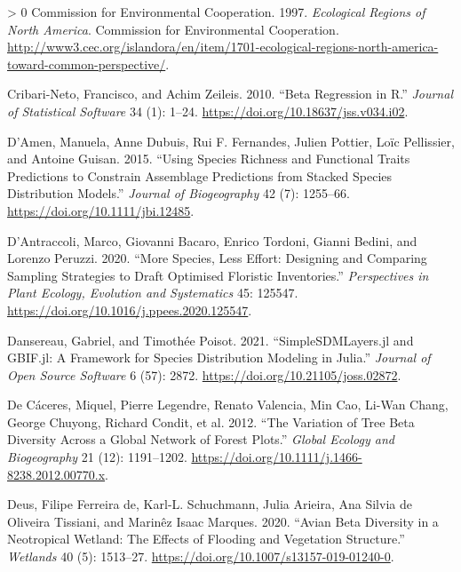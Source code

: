 \documentclass[10pt,oneside]{article}
\newlength{\cslhangindent}
\newenvironment{CSLReferences}[3] %
 {%
  \setlength{\parindent}{0pt}
  \ifodd #1 \everypar{\setlength{\hangindent}{\cslhangindent}}\ignorespaces\fi
  \ifnum #2 > 0
  \setlength{\parskip}{#2\baselineskip}
  \fi
 }%
 {}
\begin{document}
\begin{CSLReferences}{1}{0}
\leavevmode\hypertarget{ref-CommissionforEnvironmentalCooperation1997EcoReg}{}%
Commission for Environmental Cooperation. 1997. \emph{Ecological Regions
of North America}. Commission for Environmental Cooperation.
\url{http://www3.cec.org/islandora/en/item/1701-ecological-regions-north-america-toward-common-perspective/}.

\leavevmode\hypertarget{ref-Cribari-Neto2010BetReg}{}%
Cribari-Neto, Francisco, and Achim Zeileis. 2010. {``Beta Regression in
R.''} \emph{Journal of Statistical Software} 34 (1): 1--24.
\url{https://doi.org/10.18637/jss.v034.i02}.

\leavevmode\hypertarget{ref-DAmen2015UsiSpe}{}%
D'Amen, Manuela, Anne Dubuis, Rui F. Fernandes, Julien Pottier, Loïc
Pellissier, and Antoine Guisan. 2015. {``Using Species Richness and
Functional Traits Predictions to Constrain Assemblage Predictions from
Stacked Species Distribution Models.''} \emph{Journal of Biogeography}
42 (7): 1255--66. \url{https://doi.org/10.1111/jbi.12485}.

\leavevmode\hypertarget{ref-DAntraccoli2020MorSpe}{}%
D'Antraccoli, Marco, Giovanni Bacaro, Enrico Tordoni, Gianni Bedini, and
Lorenzo Peruzzi. 2020. {``More Species, Less Effort: Designing and
Comparing Sampling Strategies to Draft Optimised Floristic
Inventories.''} \emph{Perspectives in Plant Ecology, Evolution and
Systematics} 45: 125547.
\url{https://doi.org/10.1016/j.ppees.2020.125547}.

\leavevmode\hypertarget{ref-Dansereau2021SimJl}{}%
Dansereau, Gabriel, and Timothée Poisot. 2021. {``SimpleSDMLayers.jl and
GBIF.jl: A Framework for Species Distribution Modeling in Julia.''}
\emph{Journal of Open Source Software} 6 (57): 2872.
\url{https://doi.org/10.21105/joss.02872}.

\leavevmode\hypertarget{ref-DeCaceres2012VarTre}{}%
De Cáceres, Miquel, Pierre Legendre, Renato Valencia, Min Cao, Li-Wan
Chang, George Chuyong, Richard Condit, et al. 2012. {``The Variation of
Tree Beta Diversity Across a Global Network of Forest Plots.''}
\emph{Global Ecology and Biogeography} 21 (12): 1191--1202.
\url{https://doi.org/10.1111/j.1466-8238.2012.00770.x}.

\leavevmode\hypertarget{ref-deDeus2020AviBet}{}%
Deus, Filipe Ferreira de, Karl-L. Schuchmann, Julia Arieira, Ana Silvia
de Oliveira Tissiani, and Marinêz Isaac Marques. 2020. {``Avian Beta
Diversity in a Neotropical Wetland: The Effects of Flooding and
Vegetation Structure.''} \emph{Wetlands} 40 (5): 1513--27.
\url{https://doi.org/10.1007/s13157-019-01240-0}.


\end{CSLReferences}
\end{document}

